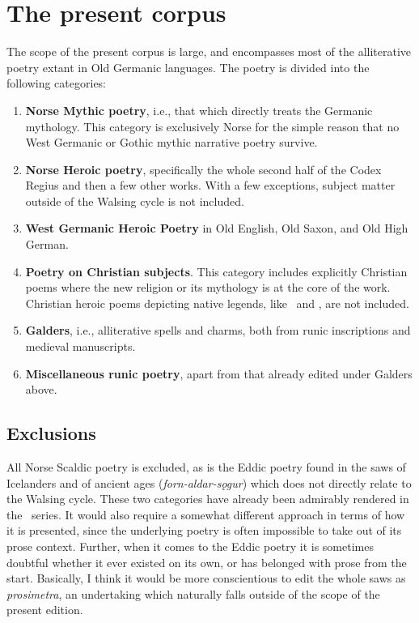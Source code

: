 \section{The present corpus}
  The scope of the present corpus is large, and encompasses most of the alliterative poetry extant in Old Germanic languages.  The poetry is divided into the following categories:
  \begin{enumerate}
    \item \textbf{Norse Mythic poetry}, i.e., that which directly treats the Germanic mythology.  This category is exclusively Norse for the simple reason that no West Germanic or Gothic mythic narrative poetry survive.
    \item \textbf{Norse Heroic poetry}, specifically the whole second half of the Codex Regius and then a few other works.  With a few exceptions, subject matter outside of the Walsing cycle is not included.
    \item \textbf{West Germanic Heroic Poetry} in Old English, Old Saxon, and Old High German.
    \item \textbf{Poetry on Christian subjects}.  This category includes explicitly Christian poems where the new religion or its mythology is at the core of the work.  Christian heroic poems depicting native legends, like \Beowulf\ and \Hildebrandslied, are not included.
    \item \textbf{Galders}, i.e., alliterative spells and charms, both from runic inscriptions and medieval manuscripts.
    \item \textbf{Miscellaneous runic poetry}, apart from that already edited under Galders above.
  \end{enumerate}

  \subsection{Exclusions}
    All Norse Scaldic poetry is excluded, as is the Eddic poetry found in the saws of Icelanders and of ancient ages (\emph{forn-aldar-sǫgur}) which does not directly relate to the Walsing cycle.  These two categories have already been admirably rendered in the \Skp\ series.  It would also require a somewhat different approach in terms of how it is presented, since the underlying poetry is often impossible to take out of its prose context.  Further, when it comes to the Eddic poetry it is sometimes doubtful whether it ever existed on its own, or has belonged with prose from the start.  Basically, I think it would be more conscientious to edit the whole saws as \emph{prosimetra}, an undertaking which naturally falls outside of the scope of the present edition.

